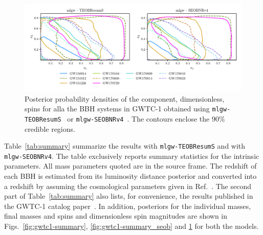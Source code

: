 \documentclass[twocolumn,showpacs,preprintnumbers,nofootinbib,prd,
superscriptaddress,10pt]{revtex4-1}
\begin{document}
\begin{figure}[t]
	\centering
    \includegraphics[width=\textwidth]{img/spins_TEOB_SEOB.pdf}
	\caption{Posterior probability densities of the component, dimensionless, spins for alla the BBH systems in GWTC-1 
	obtained using {\tt mlgw-TEOBResumS}~\cite{Nagar:2020pcj} or {\tt mlgw-SEOBNRv4}~\cite{Bohe:2016gbl}. 
	The contours enclose the $90\%$ credible regions.}
	\label{fig:gwtc1_eob_spins}
\end{figure}
Table~\ref{tab:summary} summarize the results with {\tt mlgw-TEOBResumS} 
and with {\tt mlgw-SEOBNRv4}. The table exclusively reports summary statistics 
for the intrinsic parameters. All mass parameters quoted are in the source frame. 
The redshift of each BBH is estimated from its luminosity distance posterior and 
converted into a redshift by assuming the cosmological parameters given in Ref.~\cite{Aghanim:2018eyx}.
The second part of Table~\ref{tab:summary} also lists, for convenience, the results
published in the GWTC-1 catalog paper~\cite{LIGOScientific:2018mvr}.
In addition, posteriors for the individual masses, final masses and spins and dimensionless
spin magnitudes are shown in Figs.~\ref{fig:gwtc1-summary}, \ref{fig:gwtc1-summary_seob} and \ref{fig:gwtc1_eob_spins}
for both the models.
\end{document}

